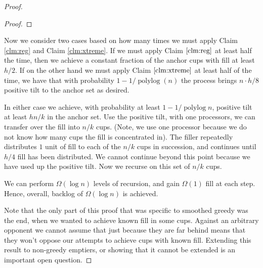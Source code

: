 \documentclass[twocolumn]{article}[11pt]
\DeclareMathOperator{\polylog}{\text{polylog}}
\begin{document}
\begin{proof}
\begin{proof}
\end{proof}

Now we consider two cases based on how many times we must apply Claim
\ref{clm:reg} and Claim \ref{clm:xtreme}. If we must apply Claim
$\ref{clm:reg}$ at least half the time, then we achieve a constant fraction of
the anchor cups with fill at least $h/2$. If on the other hand we must apply
Claim $\ref{clm:xtreme}$ at least half of the time, we have that with
probability $1- 1/\polylog(n)$ the process brings $n\cdot h/8$ positive tilt to
the anchor set as desired. 

  In either case we achieve, with probability at least $1-1/\polylog n$,
  positive tilt at least $hn/k$ in the anchor set. Use the positive tilt, with
  one processors, we can transfer over the fill into $n/k$ cups. 
  (Note, we use one processor because we do not know how many cups the fill is
  concentrated in). The filler repeatedly distributes $1$ unit of fill to each
  of the $n/k$ cups in succession, and continues until $h/4$ fill has been
  distributed. We cannot continue beyond this point because we have used up the
  positive tilt. Now we recurse on this set of $n/k$ cups.

  We can perform $\Omega(\log n)$ levels of recursion, and gain $\Omega(1)$
  fill at each step. Hence, overall, backlog of $\Omega(\log n)$ is achieved.

  Note that the only part of this proof that was specific to smoothed greedy
  was the end, when we wanted to achieve known fill in some cups. Against an
  arbitrary opponent we cannot assume that just because they are far behind
  means that they won't oppose our attempts to achieve cups with known fill.
  Extending this result to non-greedy emptiers, or showing that it cannot be
  extended is an important open question.
\end{proof}
\end{document}
